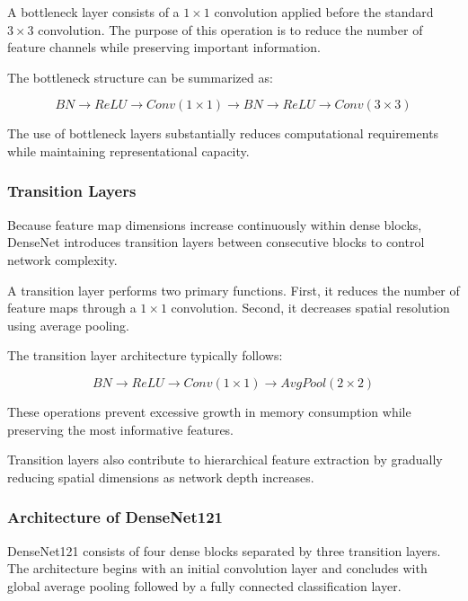 A bottleneck layer consists of a $1 \times 1$ convolution applied before the standard $3 \times 3$ convolution. The purpose of this operation is to reduce the number of feature channels while preserving important information.

The bottleneck structure can be summarized as:

\begin{equation}
	BN \rightarrow ReLU \rightarrow Conv(1\times1)
	\rightarrow BN \rightarrow ReLU \rightarrow Conv(3\times3)
\end{equation}

The use of bottleneck layers substantially reduces computational requirements while maintaining representational capacity.

\subsubsection{Transition Layers}

Because feature map dimensions increase continuously within dense blocks, DenseNet introduces transition layers between consecutive blocks to control network complexity.

A transition layer performs two primary functions. First, it reduces the number of feature maps through a $1 \times 1$ convolution. Second, it decreases spatial resolution using average pooling.

The transition layer architecture typically follows:

\begin{equation}
	BN \rightarrow ReLU \rightarrow Conv(1\times1)
	\rightarrow AvgPool(2\times2)
\end{equation}

These operations prevent excessive growth in memory consumption while preserving the most informative features.

Transition layers also contribute to hierarchical feature extraction by gradually reducing spatial dimensions as network depth increases.

\subsubsection{Architecture of DenseNet121}

DenseNet121 consists of four dense blocks separated by three transition layers. The architecture begins with an initial convolution layer and concludes with global average pooling followed by a fully connected classification layer.

